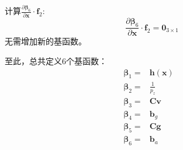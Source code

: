 \documentclass{article}
\begin{document}
\par
计算$\frac{\partial\mathbf{\beta}_6}{\partial\textbf{x}}\cdot\textbf{f}_2$:
\begin{equation}
    \frac{\partial\mathbf{\beta}_6}{\partial\textbf{x}}\cdot\textbf{f}_2=\textbf{0}_{3\times 1}
\end{equation}
无需增加新的基函数。

\par
至此，总共定义6个基函数：
\begin{eqnarray}
    \mathbf{\beta}_1 =& \textbf{h}(\textbf{x})\\
    \mathbf{\beta}_2 =& \frac{1}{p_z}\\
    \mathbf{\beta}_3 =& \textbf{Cv}\\
    \mathbf{\beta}_4 =& \textbf{b}_g\\
    \mathbf{\beta}_5 =& \textbf{Cg}\\
    \mathbf{\beta}_6 =& \textbf{b}_a& 
\end{eqnarray}
\end{document}
